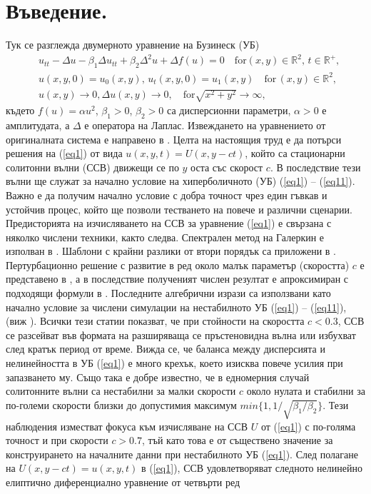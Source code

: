 \documentclass{article}
\newcommand{\rf}[1]{(\ref{#1})}
\newcommand{\RR}{\mathbb{R}}
\begin{document}
\section{Въведение.}\label{introduction}

Тук се разглежда двумерното уравнение на Бузинеск (УБ)
\begin{align}
&u_{tt} - \Delta u -\beta_1  \Delta u_{tt} +\beta_2 \Delta ^2 u + \Delta f(u)=0   \quad \text{for}  (x,y) \in \RR^2, \, t\in\RR^+,\label{eq1}
\\ \nonumber &u(x,y,0)=u_0(x,y), \, u_t(x,y,0)=u_1(x,y)   \quad\text{for} \, (x,y) \in \RR^2,
\\  &u(x,y) \rightarrow 0,  \Delta u(x,y) \rightarrow 0 ,  \quad \text{for}  \sqrt{x^2 + y^2} \rightarrow \infty, \label{eq11}
\end{align}
където $f(u)=\alpha u^2$, $\beta_1>0$, $\beta_2>0$ са дисперсионни параметри,  $\alpha>0$ е амплитудата, а $\Delta$ е оператора на Лаплас. Извеждането на уравнението от оригиналната система е направено в \cite{ChChr}. Целта на настоящия труд е да потърси решения на \rf{eq1} от вида $u(x,y,t)=U(x,y-ct)$, който са стационарни солитонни вълни (ССВ) движещи се по $y$ оста със скорост $c$. В последствие тези вълни ще служат за начално условие на хиперболичното (УБ) \rf{eq1} -- \rf{eq11}. Важно е да получим начално условие с добра точност чрез един гъвкав и устойчив процес, който ще позволи тестването на повече и различни сценарии. Предисторията на изчисляването на ССВ за уравнение \rf{eq1} е свързана с няколко числени техники, както следва. Спектрален метод на Галеркин е изполван в \cite{chr-chr-07,chr-chr}. Шаблони с крайни разлики от втори порядък са приложени в \cite{Ch2012}. Пертурбационно решение с развитие в ред около малък параметър (скоростта) $c$ е представено в  \cite{Ch2011}, а в последствие полученият числен резултат е апроксимиран с подходящи формули в \cite{Ch2011}. Последните алгебрични изрази са използвани като начално условие за числени симулации на нестабилното УБ \rf{eq1} -- \rf{eq11}, (виж  \cite{cher,dani}). Всички тези статии показват, че при стойности на скоростта $c<0.3$, ССВ се разсейват във формата на разширяваща се пръстеновидна вълна или избухват след кратък период от време. Вижда се, че баланса между дисперсията и нелинейността в УБ \rf{eq1} е много крехък, което изисква повече усилия при запазването му. Също така е добре известно, че в едномерния случай солитонните вълни са нестабилни за малки скорости $c$ около нулата и стабилни за по-големи скорости близки до допустимия максимум $min\{1, 1/\sqrt{\beta_1/\beta_2}\}$.
Тези наблюдения изместват фокуса към изчисляване на ССВ $U$ от \rf{eq1} с по-голяма точност и при скорости $c > 0.7$, тъй като това е от съществено значение за конструирането на началните данни при нестабилното УБ \rf{eq1}. 
След полагане на $U(x,y-ct)=u(x,y,t)$ в \rf{eq1}, ССВ удовлетворяват следното нелинейно елиптично диференциално уравнение от четвърти ред
\end{document}

